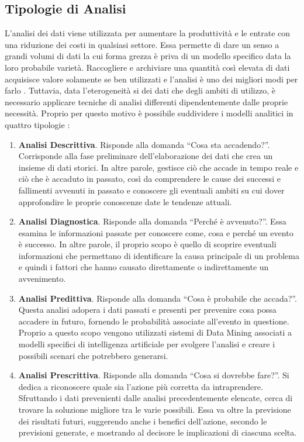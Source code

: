 \subsection{Tipologie di Analisi}
L'analisi dei dati viene utilizzata per aumentare la produttività e le entrate con una riduzione dei costi in qualsiasi settore. Essa permette di dare un senso a grandi volumi di dati la cui forma grezza è priva di un modello specifico data la loro probabile varietà. Raccogliere e archiviare una quantità così elevata di dati acquisisce valore solamente se ben utilizzati e l'analisi è uno dei migliori modi per farlo \cite{researchgate_big_data_analytics}.
Tuttavia, data l'eterogeneità si dei dati che degli ambiti di utilizzo, è necessario applicare tecniche di analisi differenti dipendentemente dalle proprie necessità. Proprio per questo motivo è possibile suddividere i modelli analitici in quattro tipologie \cite{big_data_analytics_harnessing_data_for_new_business_models}:

\begin{enumerate}
    \item \textbf{Analisi Descrittiva}. Risponde alla domanda “Cosa sta accadendo?”. Corrisponde alla fase preliminare dell'elaborazione dei dati che crea un insieme di dati storici. In altre parole, gestisce ciò che accade in tempo reale e ciò che è accaduto in passato, così da comprendere le cause dei successi e fallimenti avvenuti in passato e conoscere gli eventuali ambiti su cui dover approfondire le proprie conoscenze date le tendenze attuali.
    \item \textbf{Analisi Diagnostica}. Risponde alla domanda “Perché è avvenuto?”. Essa esamina le informazioni passate per conoscere come, cosa e perché un evento è successo. In altre parole, il proprio scopo è quello di scoprire eventuali informazioni che permettano di identificare la causa principale di un problema e quindi i fattori che hanno causato direttamente o indirettamente un avvenimento.
    \item \textbf{Analisi Predittiva}. Risponde alla domanda “Cosa è probabile che accada?”. Questa analisi adopera i dati passati e presenti per prevenire cosa possa accadere in futuro, fornendo le probabilità associate all'evento in questione. Proprio a questo scopo vengono utilizzati sistemi di Data Mining associati a modelli specifici di intelligenza artificiale per svolgere l'analisi e creare i possibili scenari che potrebbero generarsi.
    \item \textbf{Analisi Prescrittiva}. Risponde alla domanda “Cosa si dovrebbe fare?”. Si dedica a riconoscere quale sia l'azione più corretta da intraprendere. Sfruttando i dati prevenienti dalle analisi precedentemente elencate, cerca di trovare la soluzione migliore tra le varie possibili. Essa va oltre la previsione dei risultati futuri, suggerendo anche i benefici dell'azione, secondo le previsioni generate, e mostrando al decisore le implicazioni di ciascuna scelta.
\end{enumerate}

